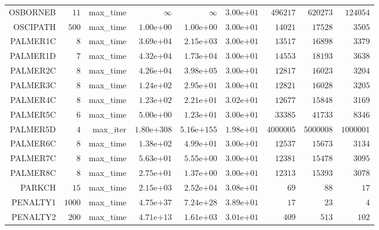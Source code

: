 \begin{longtable}{rrrrrrrrr}
OSBORNEB & \(    11\) & max\_time & \(\infty\) & \(\infty\) & \( 3.00\)e\(+01\) & \(496217\) & \(620273\) & \(124054\) \\
OSCIPATH & \(   500\) & max\_time & \( 1.00\)e\(+00\) & \( 1.00\)e\(+00\) & \( 3.00\)e\(+01\) & \( 14021\) & \( 17528\) & \(  3505\) \\
PALMER1C & \(     8\) & max\_time & \( 3.69\)e\(+04\) & \( 2.15\)e\(+03\) & \( 3.00\)e\(+01\) & \( 13517\) & \( 16898\) & \(  3379\) \\
PALMER1D & \(     7\) & max\_time & \( 4.32\)e\(+04\) & \( 1.73\)e\(+04\) & \( 3.00\)e\(+01\) & \( 14553\) & \( 18193\) & \(  3638\) \\
PALMER2C & \(     8\) & max\_time & \( 4.26\)e\(+04\) & \( 3.98\)e\(+05\) & \( 3.00\)e\(+01\) & \( 12817\) & \( 16023\) & \(  3204\) \\
PALMER3C & \(     8\) & max\_time & \( 1.24\)e\(+02\) & \( 2.95\)e\(+01\) & \( 3.00\)e\(+01\) & \( 12821\) & \( 16028\) & \(  3205\) \\
PALMER4C & \(     8\) & max\_time & \( 1.23\)e\(+02\) & \( 2.21\)e\(+01\) & \( 3.02\)e\(+01\) & \( 12677\) & \( 15848\) & \(  3169\) \\
PALMER5C & \(     6\) & max\_time & \( 5.00\)e\(+00\) & \( 1.23\)e\(+01\) & \( 3.00\)e\(+01\) & \( 33385\) & \( 41733\) & \(  8346\) \\
PALMER5D & \(     4\) & max\_iter & \(1.80\)e\(+308\) & \(5.16\)e\(+155\) & \( 1.98\)e\(+01\) & \(4000005\) & \(5000008\) & \(1000001\) \\
PALMER6C & \(     8\) & max\_time & \( 1.38\)e\(+02\) & \( 4.99\)e\(+01\) & \( 3.00\)e\(+01\) & \( 12537\) & \( 15673\) & \(  3134\) \\
PALMER7C & \(     8\) & max\_time & \( 5.63\)e\(+01\) & \( 5.55\)e\(+00\) & \( 3.00\)e\(+01\) & \( 12381\) & \( 15478\) & \(  3095\) \\
PALMER8C & \(     8\) & max\_time & \( 2.75\)e\(+01\) & \( 1.37\)e\(+00\) & \( 3.00\)e\(+01\) & \( 12313\) & \( 15393\) & \(  3078\) \\
PARKCH & \(    15\) & max\_time & \( 2.15\)e\(+03\) & \( 2.52\)e\(+04\) & \( 3.08\)e\(+01\) & \(    69\) & \(    88\) & \(    17\) \\
PENALTY1 & \(  1000\) & max\_time & \( 4.75\)e\(+37\) & \( 7.24\)e\(+28\) & \( 3.89\)e\(+01\) & \(    17\) & \(    23\) & \(     4\) \\
PENALTY2 & \(   200\) & max\_time & \( 4.71\)e\(+13\) & \( 1.61\)e\(+03\) & \( 3.01\)e\(+01\) & \(   409\) & \(   513\) & \(   102\) \\

\end{longtable}
